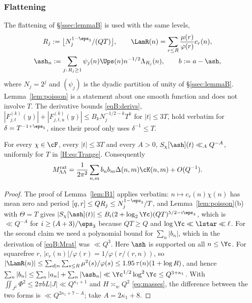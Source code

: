 \subsubsection*{Flattening}
The flattening of \S\ref{ssec:lemmaB} is used with the same levels,
\begin{gather*}
R_j:=\big\lfloor N_j^{1-\eps_3}/(QT)\big\rfloor,\qquad \LamR(n)=\sum_{r\le R}\frac{\mu(r)}{\varphi(r)}c_r(n),\\
\ash_n:=\sum_{j:\,R_j\ge1}\psi_j(n)\Ups(n)n^{-1/2}\Lambda_{R_j}(n),\qquad b:=a-\ash,
\end{gather*}
where $N_j=2^j$ and $(\psi_j)$ is the dyadic partition of unity of \S\ref{ssec:lemmaB}. Lemma~\ref{lem:poisson} is a statement about one smooth function and does not involve $T$. The derivative bounds \eqref{eqB:derivs}, $|F_{j,t}^{(k)}(y)|+|F_{j,t,u}^{(k)}(y)|\le B_kN_j^{-1/2-k}T^k$ for $|t|\le3T$, hold verbatim for $\delta=T^{-1+\eps_5}$, since their proof only uses $\delta^{-1}\le T$.

\begin{lemma}\label{H:lem:B1}
For every $\chi\in\cF$, every $|t|\le3T$ and every $A>0$, $S_\chi[\ash](t)\ll_AQ^{-A}$, uniformly for $T$ in \eqref{H:eq:Trange}. Consequently
\[
M^{\rm rat}_{\Lambda\Lambda}=\frac1{2\pi^2}\sum_{n,m}b_nb_m\Delta(n,m)\cK(n,m)+O(Q^{-1}).
\]
\end{lemma}
\begin{proof}
The proof of Lemma~\ref{lem:B1} applies verbatim: $n\mapsto c_r(n)\chi(n)$ has mean zero and period $[q,r]\le QR_j\le N_j^{1-\eps_3}/T$, and Lemma~\ref{lem:poisson}(b) with $\Theta=T$ gives $|S_\chi[\ash](t)|\le B_i(2+\log_2\Yc)(QT)^{5/2-i\eps_3}$, which is $\ll Q^{-A}$ for $i\ge(A+3)/\eps_3$ because $QT\ge Q$ and $\log\Yc\ll\lstar\ll\ell$. For the second claim we need a polynomial bound for $\sum_n|b_n|$, which in the derivation of \eqref{eqB:Mrat} was $\ll Q^3$. Here $\ash$ is supported on all $n\le\Yc$. For squarefree $r$, $|c_r(n)|/\varphi(r)=1/\varphi(r/(r,n))$, so $|\LamR(n)|\le\sum_{d\mid n}\sum_{s\le R}\mu^2(s)/\varphi(s)\le1.95\,\tau(n)(1+\log R)$, and hence $\sum_n|b_n|\le\sum_n|a_n|+\sum_n|\ash_n|\ll\Yc^{1/2}\log^2\Yc\le Q^{3+\kappa_1}$. With $\iint_{J^2}\Phi^2\le2\pi bL|J|\ll Q^{\kappa_1+1}$ and $H\asymp_wQ^2$ \eqref{eq:masses}, the difference between the two forms is $\ll Q^{2\kappa_1+7-A}$; take $A=2\kappa_1+8$.
\end{proof}

